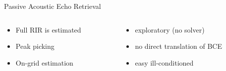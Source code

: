 \begin{frame}[t]{\alert{Passive} Acoustic Echo Retrieval \hfill\faPalette}
\begin{columns}[onlytextwidth]
            \begin{column}{.48\textwidth}
                \begin{itemize}
                    \item Full RIR is estimated
                    \item Peak picking
                    \item On-grid estimation %
                \end{itemize}
            \end{column}
            \begin{column}{.48\textwidth}
                \begin{itemize}
                    \item[\faWpexplorer] exploratory (no solver)
                    \item[\faLanguage] no direct translation of BCE
                    \item easy ill-conditioned
                \end{itemize}
            \end{column}%
        \end{columns}

\end{frame}

